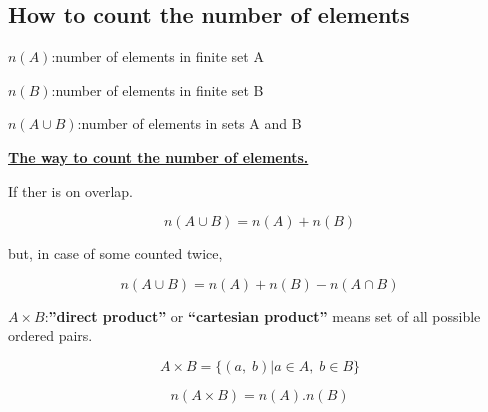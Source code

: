\documentclass[autodetect-engine]{jsarticle}
\begin{document}
{  \subsection{How to count the number of elements}
  $n(A)$:number of elements in finite set A
  
  $n(B)$:number of elements in finite set B
  
  $n(A\cup B)$:number of elements in sets A and B

  \underline{\textbf{The way to count the number of elements.}}

  If ther is on overlap.

  \[n(A\cup B) = n(A) + n(B)\]

  but, in case of some counted twice,

  \[n(A\cup B) = n(A) + n(B) - n(A\cap B)\]

  $A\times B$:\textbf{''direct product''} or \textbf{``cartesian product''} means set of all possible ordered pairs.

  \[
  A \times B = \{(a,\;b)|a \in A,\;b \in B\}
  \]

  \[
  n(A\times B) = n(A).n(B)
  \]
  
}
\end{document}
